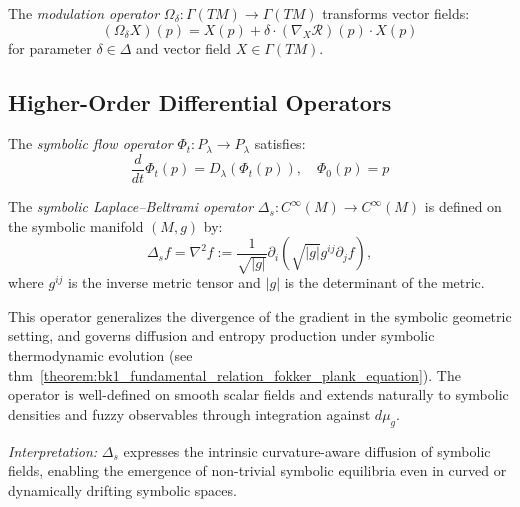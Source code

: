 \begin{definition}
\label{definition:bk6_modulation_operator_complete}
The \emph{modulation operator} $\Omega_\delta : \Gamma(TM) \to \Gamma(TM)$ transforms vector fields:
\begin{equation}
(\Omega_\delta X)(p) = X(p) + \delta \cdot (\nabla_X \mathcal{R})(p) \cdot X(p)
\end{equation}
for parameter $\delta \in \Delta$ and vector field $X \in \Gamma(TM)$.
\end{definition}

\subsection{Higher-Order Differential Operators}
\label{subsection:bk6_higher_order_differential_operators}

\begin{definition}
\label{definition:bk6_symbolic_flow_operator_complete}
The \emph{symbolic flow operator} $\Phi_t : P_\lambda \to P_\lambda$ satisfies:
\begin{equation}
\frac{d}{dt}\Phi_t(p) = D_\lambda(\Phi_t(p)), \quad \Phi_0(p) = p
\end{equation}
\end{definition}

\begin{definition}
\label{definition:bk6_symbolic_laplace_beltrami_operator_complete}
The \emph{symbolic Laplace–Beltrami operator} $\Delta_s : C^\infty(M) \to C^\infty(M)$ is defined on the symbolic manifold $(M, g)$ by:
\[
\Delta_s f = \nabla^2 f := \frac{1}{\sqrt{|g|}} \partial_i \left( \sqrt{|g|} g^{ij} \partial_j f \right),
\]
where $g^{ij}$ is the inverse metric tensor and $|g|$ is the determinant of the metric.

This operator generalizes the divergence of the gradient in the symbolic geometric setting, and governs diffusion and entropy production under symbolic thermodynamic evolution (see thm~\ref{theorem:bk1_fundamental_relation_fokker_plank_equation}). The operator is well-defined on smooth scalar fields and extends naturally to symbolic densities and fuzzy observables through integration against $d\mu_g$.

\emph{Interpretation:} $\Delta_s$ expresses the intrinsic curvature-aware diffusion of symbolic fields, enabling the emergence of non-trivial symbolic equilibria even in curved or dynamically drifting symbolic spaces.
\end{definition}

